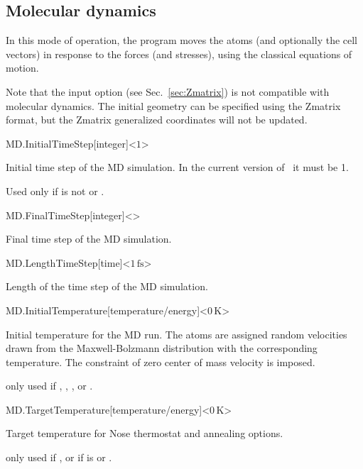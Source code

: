 \subsection{Molecular dynamics}

In this mode of operation, the program moves the atoms (and optionally
the cell vectors) in response to the forces (and stresses), using the
classical equations of motion.

Note that the  input option (see Sec.~\ref{sec:Zmatrix}) is not
compatible with molecular dynamics. The initial geometry can be
specified using the Zmatrix format, but the Zmatrix generalized
coordinates will not be updated.


\begin{fdfentry}{MD.InitialTimeStep}[integer]<$1$>
  
  Initial time step of the MD simulation.  In the current version of
  \siesta\ it must be 1.

  Used only if  is not  or .

\end{fdfentry}

\begin{fdfentry}{MD.FinalTimeStep}[integer]<>

  Final time step of the MD simulation.

\end{fdfentry}


\begin{fdfentry}{MD.LengthTimeStep}[time]<$1\,\mathrm{fs}$>

  Length of the time step of the MD simulation.

\end{fdfentry}

\begin{fdfentry}{MD.InitialTemperature}[temperature/energy]<$0\,\mathrm K$>
  
  Initial temperature for the MD run. The atoms are assigned random
  velocities drawn from the Maxwell-Bolzmann distribution with the
  corresponding temperature. The constraint of zero center of mass
  velocity is imposed.

  \note only used if  , ,
  ,  or
  . 

\end{fdfentry}

\begin{fdfentry}{MD.TargetTemperature}[temperature/energy]<$0\,\mathrm K$>

  Target temperature for Nose thermostat and annealing options.

  \note only used if  ,
   or
   if  is  or
  .

\end{fdfentry}

